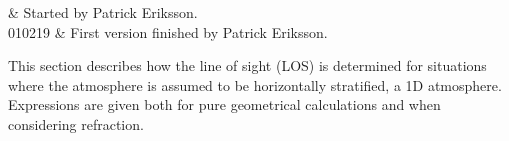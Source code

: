 %
%
 \label{sec:los}


%
%
 & Started by Patrick Eriksson. \\
  010219 & First version finished by Patrick Eriksson.\\
\stophistory


%
%
%



%
%
This section describes how the line of sight (LOS) is determined
for situations where the atmosphere is assumed to be horizontally
stratified, a 1D atmosphere. Expressions are given both for pure
geometrical calculations and when considering refraction.



